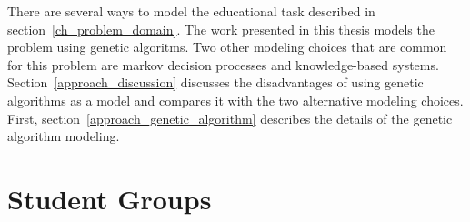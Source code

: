 \label{ch_approach}
There are several ways to model the educational task described in
section~\ref{ch_problem_domain}. The work presented in this thesis models the
problem using genetic algoritms. Two other modeling choices that are common for
this problem are markov decision processes and knowledge-based systems.
Section~\ref{approach_discussion} discusses the disadvantages of using genetic
algorithms as a model and compares it with the two alternative modeling
choices. First, section~\ref{approach_genetic_algorithm} describes the details
of the genetic algorithm modeling.

\section{Student Groups}
